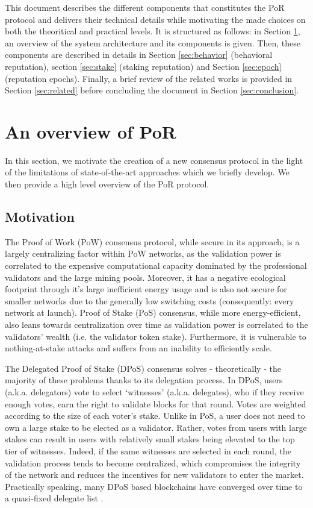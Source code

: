 \documentclass[]{article}
\begin{document}
This document describes the different components that constitutes the PoR protocol and delivers their technical details while motivating the made choices on both the theoritical and practical levels. It is structured as follows: in Section \ref{sec:overview}, an overview of the system architecture and its components is given. Then, these components are described in details in Section \ref{sec:behavior} (behavioral reputation), section \ref{sec:stake} (staking reputation) and Section \ref{sec:epoch} (reputation epochs). Finally, a brief review of the related works is provided in Section \ref{sec:related} before concluding the document in Section \ref{sec:conclusion}.

\section{An overview of PoR}
\label{sec:overview}
In this section, we motivate the creation of a new consensus protocol in the light of the limitations of state-of-the-art approaches which we briefly develop. We then provide a high level overview of the PoR protocol. 
\subsection{Motivation}

The Proof of Work (PoW) consensus protocol, while secure in its approach, is a largely centralizing factor within PoW networks, as the validation power is correlated to the expensive computational capacity dominated by the professional validators and the large mining pools. Moreover, it has a negative ecological footprint through it's large inefficient energy usage and is also not secure for smaller networks due to the generally low switching costs (consequently: every network at launch). Proof of Stake (PoS) consensus, while more energy-efficient, also leans towards centralization over time  as validation power is correlated to the validators' wealth (i.e. the validator token stake). Furthermore, it is vulnerable to nothing-at-stake attacks and suffers from an inability to efficiently scale.

The Delegated Proof of Stake (DPoS) consensus solves - theoretically - the majority of these problems thanks to its delegation process. In DPoS, users (a.k.a. delegators) vote to select ‘witnesses’ (a.k.a. delegates), who if they receive enough votes, earn the right to validate blocks for that round. Votes are weighted according to the size of each voter's stake. Unlike in PoS, a user does not need to own a large stake to be elected as a validator. Rather, votes from users with large stakes can result in users with relatively small stakes being elevated to the top tier of witnesses. Indeed, if the same witnesses are selected in each round, the validation process tends to become centralized, which compromises the integrity of the network and reduces the incentives for new validators to enter the market. Practically speaking, many DPoS based blockchains have converged over time to a quasi-fixed delegate list . 
\end{document}
